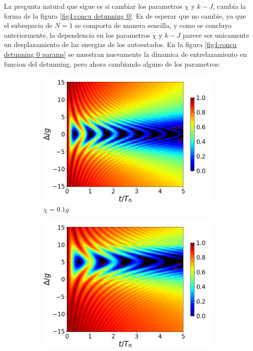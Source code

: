 La pregunta natural que sigue es si cambiar los parametros $\chi$ y $k-J$, cambia la forma de la figura \ref{fig4:concu detunning 0}. Es de esperar que no cambie, ya que el subespacio de $N=1$ se comporta de manera sencilla, y como se concluyo anteriormente, la dependencia en los parametros $\chi$ y $k-J$ parece ser unicamente un desplazamiento de las energias de los autoestados. En la figura \ref{fig4:concu detunning 0 params} se muestran nuevamente la dinamica de entrelazamiento en funcion del detunning, pero ahora cambiando alguno de los parametros:

\begin{figure}[h]
    \centering
    \begin{subfigure}{0.49\textwidth}
        \includegraphics[width=\textwidth]{figuras/ch4/concu/delta/eg0+ge0 k=0.0g x=0.1g J=0.0g gamma=0.25g concu delta dis.png}
        \caption{$\chi=0.1g$}
        \label{fig4:concu detunning x1}
    \end{subfigure}
    \hfill
    \begin{subfigure}{0.49\textwidth}
        \includegraphics[width=\textwidth]{figuras/ch4/concu/delta/eg0+ge0 k=0.0g x=5.0g J=0.0g gamma=0.25g concu delta dis.png}

\end{subfigure}
\end{figure}
